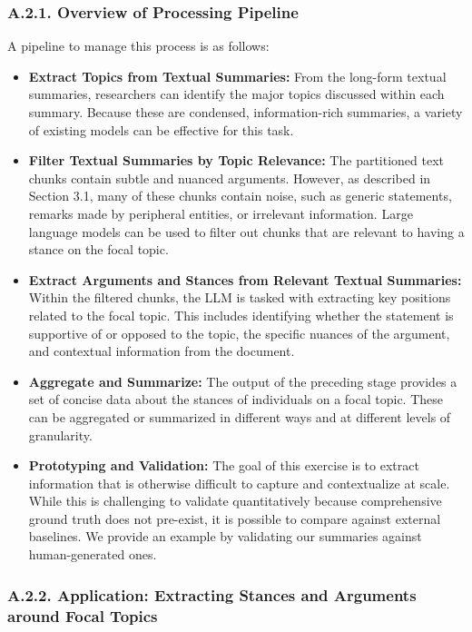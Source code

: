 \documentclass[11pt]{article}
\begin{document}
\subsubsection*{A.2.1. Overview of Processing Pipeline}

A pipeline to manage this process is as follows:

\begin{itemize}
    \item \textbf{Extract Topics from Textual Summaries:} From the long-form textual summaries, researchers can identify the major topics discussed within each summary. Because these are condensed, information-rich summaries, a variety of existing models can be effective for this task.
    \item \textbf{Filter Textual Summaries by Topic Relevance:} The partitioned text chunks contain subtle and nuanced arguments. However, as described in Section 3.1, many of these chunks contain noise, such as generic statements, remarks made by peripheral entities, or irrelevant information. Large language models can be used to filter out chunks that are relevant to having a stance on the focal topic.
    \item \textbf{Extract Arguments and Stances from Relevant Textual Summaries:} Within the filtered chunks, the LLM is tasked with extracting key positions related to the focal topic. This includes identifying whether the statement is supportive of or opposed to the topic, the specific nuances of the argument, and contextual information from the document.
    \item \textbf{Aggregate and Summarize:} The output of the preceding stage provides a set of concise data about the stances of individuals on a focal topic. These can be aggregated or summarized in different ways and at different levels of granularity.
    \item \textbf{Prototyping and Validation:} The goal of this exercise is to extract information that is otherwise difficult to capture and contextualize at scale. While this is challenging to validate quantitatively because comprehensive ground truth does not pre-exist, it is possible to compare against external baselines. We provide an example by validating our summaries against human-generated ones.
\end{itemize}

\subsubsection*{A.2.2. Application: Extracting Stances and Arguments around Focal Topics}
\end{document}

